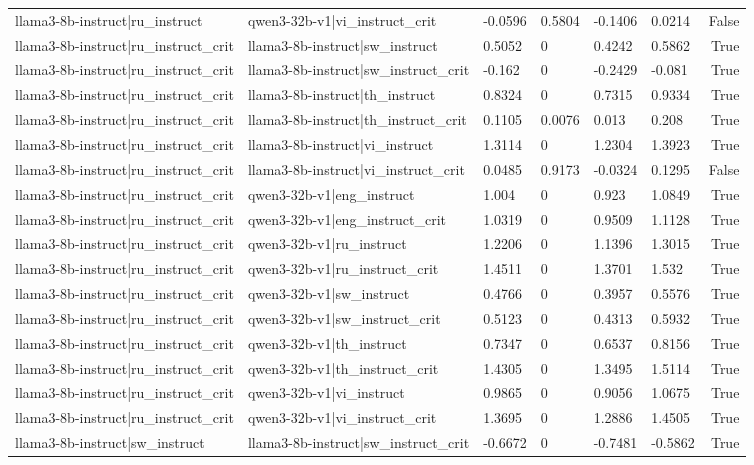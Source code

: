 \begin{table}
\begin{tabular}{llllllr}
llama3-8b-instruct|ru_instruct & qwen3-32b-v1|vi_instruct_crit & -0.0596 & 0.5804 & -0.1406 & 0.0214 & False \\
llama3-8b-instruct|ru_instruct_crit & llama3-8b-instruct|sw_instruct & 0.5052 & 0 & 0.4242 & 0.5862 & True \\
llama3-8b-instruct|ru_instruct_crit & llama3-8b-instruct|sw_instruct_crit & -0.162 & 0 & -0.2429 & -0.081 & True \\
llama3-8b-instruct|ru_instruct_crit & llama3-8b-instruct|th_instruct & 0.8324 & 0 & 0.7315 & 0.9334 & True \\
llama3-8b-instruct|ru_instruct_crit & llama3-8b-instruct|th_instruct_crit & 0.1105 & 0.0076 & 0.013 & 0.208 & True \\
llama3-8b-instruct|ru_instruct_crit & llama3-8b-instruct|vi_instruct & 1.3114 & 0 & 1.2304 & 1.3923 & True \\
llama3-8b-instruct|ru_instruct_crit & llama3-8b-instruct|vi_instruct_crit & 0.0485 & 0.9173 & -0.0324 & 0.1295 & False \\
llama3-8b-instruct|ru_instruct_crit & qwen3-32b-v1|eng_instruct & 1.004 & 0 & 0.923 & 1.0849 & True \\
llama3-8b-instruct|ru_instruct_crit & qwen3-32b-v1|eng_instruct_crit & 1.0319 & 0 & 0.9509 & 1.1128 & True \\
llama3-8b-instruct|ru_instruct_crit & qwen3-32b-v1|ru_instruct & 1.2206 & 0 & 1.1396 & 1.3015 & True \\
llama3-8b-instruct|ru_instruct_crit & qwen3-32b-v1|ru_instruct_crit & 1.4511 & 0 & 1.3701 & 1.532 & True \\
llama3-8b-instruct|ru_instruct_crit & qwen3-32b-v1|sw_instruct & 0.4766 & 0 & 0.3957 & 0.5576 & True \\
llama3-8b-instruct|ru_instruct_crit & qwen3-32b-v1|sw_instruct_crit & 0.5123 & 0 & 0.4313 & 0.5932 & True \\
llama3-8b-instruct|ru_instruct_crit & qwen3-32b-v1|th_instruct & 0.7347 & 0 & 0.6537 & 0.8156 & True \\
llama3-8b-instruct|ru_instruct_crit & qwen3-32b-v1|th_instruct_crit & 1.4305 & 0 & 1.3495 & 1.5114 & True \\
llama3-8b-instruct|ru_instruct_crit & qwen3-32b-v1|vi_instruct & 0.9865 & 0 & 0.9056 & 1.0675 & True \\
llama3-8b-instruct|ru_instruct_crit & qwen3-32b-v1|vi_instruct_crit & 1.3695 & 0 & 1.2886 & 1.4505 & True \\
llama3-8b-instruct|sw_instruct & llama3-8b-instruct|sw_instruct_crit & -0.6672 & 0 & -0.7481 & -0.5862 & True \\

\end{tabular}
\end{table}
